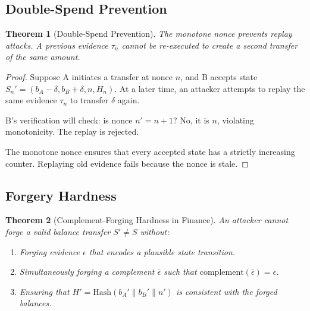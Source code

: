 \documentclass[twocolumn,10pt,a4paper]{article}
\theoremstyle{plain}
\newtheorem{theorem}{Theorem}[section]
\theoremstyle{definition}
\newcommand{\comp}[1]{\overline{#1}}
\begin{document}
\subsection{Double-Spend Prevention}

\begin{theorem}[Double-Spend Prevention]
The monotone nonce prevents replay attacks. A previous evidence $\tau_n$ cannot be re-executed to create a second transfer of the same amount.
\end{theorem}

\begin{proof}
Suppose A initiates a transfer at nonce $n$, and B accepts state $S_n' = (b_A - \delta, b_B + \delta, n, H_n)$. At a later time, an attacker attempts to replay the same evidence $\tau_n$ to transfer $\delta$ again.

B's verification will check: is nonce $n' = n + 1$? No, it is $n$, violating monotonicity. The replay is rejected.

The monotone nonce ensures that every accepted state has a strictly increasing counter. Replaying old evidence fails because the nonce is stale.
\end{proof}

\subsection{Forgery Hardness}

\begin{theorem}[Complement-Forging Hardness in Finance]
An attacker cannot forge a valid balance transfer $S' \neq S$ without:
\begin{enumerate}
\item Forging evidence $\epsilon$ that encodes a plausible state transition.
\item Simultaneously forging a complement $\comp{\epsilon}$ such that $\mathrm{complement}(\comp{\epsilon}) = \epsilon$.
\item Ensuring that $H' = \mathrm{Hash}(b_A' \| b_B' \| n')$ is consistent with the forged balances.
\end{enumerate}
\end{theorem}
\end{document}

